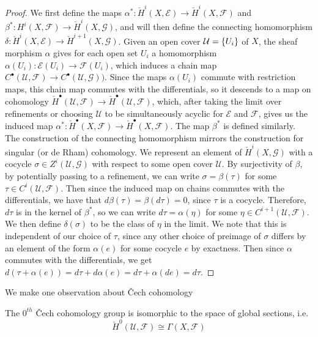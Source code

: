 \begin{proof}
We first define the maps
$\alpha^* : \check{H}^i(X,\mathcal{E}) \to \check{H}^i(X, \mathcal{F})$
and $\beta^* : H^i(X, \mathcal{F}) \to \check{H}^i(X, \mathcal{G})$, and will then define
the connecting homomorphism
$\delta : \check{H}^i(X,\mathcal{E}) \to \check{H}^{i+1}(X, \mathcal{G})$. Given
an open cover $\mathcal{U} = \left\lbrace U_i \right\rbrace$ of $X$, the sheaf morphism $\alpha$ gives for
each open set $U_i$ a homomorphism $\alpha(U_i) : \mathcal{E}(U_i) \to \mathcal{F}(U_i)$,
which induces a chain map
$C^\bullet(\mathcal{U},\mathcal{F}) \to C^\bullet(\mathcal{U}, \mathcal{G}))$. Since
the maps $\alpha(U_i)$ commute with restriction maps, this chain map commutes with
the differentials, so it descends to a map on cohomology
$\check{H}^\bullet(\mathcal{U},\mathcal{F})\to\check{H}^\bullet(\mathcal{U},\mathcal{F})$,
which, after taking the limit over refinements or choosing $\mathcal{U}$ to be
simultaneously acyclic for $\mathcal{E}$ and $\mathcal{F}$, gives us the induced
map $\alpha^* : \check{H}^\bullet(X,\mathcal{F})\to\check{H}^\bullet(X,\mathcal{F})$.
The map $\beta^*$ is defined similarly. \\

The construction of the connecting homomorphism
mirrors the construction for singular (or de Rham) cohomology. We represent
an element of $\check{H}^i(X,\mathcal{G})$ with a cocycle
$\sigma \in Z^i(\mathcal{U}, \mathcal{G})$ with respect to some open cover $\mathcal{U}$.
By surjectivity of $\beta$, by potentially passing to a refinement, we can
write $\sigma = \beta(\tau)$ for some $\tau \in C^i(\mathcal{U}, \mathcal{F})$. Then
since the induced map on chains commutes with the differentials, we have that
$d\beta(\tau) = \beta(d\tau) = 0$, since $\tau$ is a cocycle. Therefore,
$d\tau$ is in the kernel of $\beta^*$, so we can write $d\tau = \alpha(\eta)$
for some $\eta \in C^{i+1}(\mathcal{U}, \mathcal{F})$. We then define
$\delta(\sigma)$ to be the class of $\eta$ in the limit. We note that
this is independent of our choice of $\tau$, since any other choice of
preimage of $\sigma$ differs by an element of the form $\alpha(e)$ for some cocycle
$e$ by exactness. Then since $\alpha$ commutes with the differentials, we get
$d(\tau + \alpha(e)) = d\tau + d\alpha(e) = d\tau + \alpha(de) = d\tau$.
\end{proof}
%
We make one observation about \v{C}ech cohomology
%
\begin{prop}
The $0^{th}$ \v{C}ech cohomology group is isomorphic to the space of global sections,
i.e.
\[
\check{H}^0(\mathcal{U}, \mathcal{F}) \cong \Gamma(X, \mathcal{F})
\]
\end{prop}
